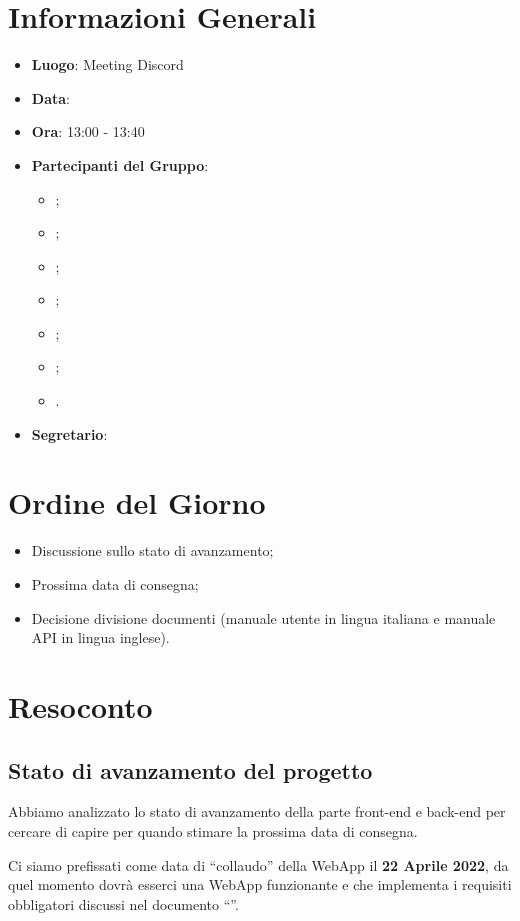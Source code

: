 \section{Informazioni Generali}

\begin{itemize}
	\item{\textbf{Luogo}}: Meeting Discord
	\item{\textbf{Data}}: \D
	\item{\textbf{Ora}}: 13:00 - 13:40
	\item{\textbf{Partecipanti del Gruppo}}:
	\begin{itemize}
		\item{\EP{};}
		\item{\FP{};}
		\item{\GC{};}
		\item{\LW{};}
		\item{\MG{};}
		\item{\MG{};}
		\item{\PV{}.}
	\end{itemize}
	\item{\textbf{Segretario}}: \PV{}
\end{itemize}

\section{Ordine del Giorno}
\begin{itemize}
	\item{Discussione sullo stato di avanzamento;}
	\item{Prossima data di consegna;}
	\item{Decisione divisione documenti (manuale utente in lingua italiana e manuale API in lingua inglese).}
\end{itemize}

\section{Resoconto}

\subsection{Stato di avanzamento del progetto}

Abbiamo analizzato lo stato di avanzamento della parte front-end e back-end per cercare di capire per quando stimare la prossima data di consegna.

Ci siamo prefissati come data di “collaudo” della WebApp il \textbf{22 Aprile 2022}, da quel momento dovrà esserci una WebApp funzionante e che implementa i requisiti obbligatori discussi nel documento “\AdR{}”.

